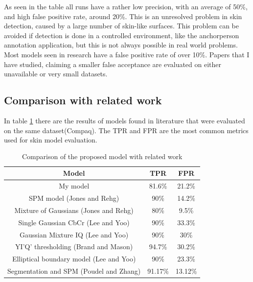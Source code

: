\documentclass[12pt]{report}
\begin{document}
	As seen in the table all runs have a rather low precision, with an average of 50\%, and high false positive rate, around 20\%. This is an unresolved problem in skin detection, caused by a large number of skin-like surfaces. This problem can be avoided if detection is done in a controlled environment, like the anchorperson annotation application, but this is not always possible in real world problems.  Most models seen in research have a false positive rate of over 10\%. Papers that I have studied, claiming a smaller false acceptance are evaluated on either unavailable or very small datasets.

	\subsection{Comparison with related work}
	
	In table \ref{tab:results_comparison} there are the results of models found in literature that were evaluated on the same dataset(Compaq). The TPR and FPR are the most common metrics used for skin model evaluation.
	
	\begin{table}[h!]
		\begin{center}
			\caption{Comparison of the proposed model with related work}
			\label{tab:results_comparison}
			\begin{tabular}{c|c|c}
				\textbf{Model} & \textbf{TPR} & \textbf{FPR} \\
				\hline
				My model & 81.6\% & 21.2\% \\
				SPM model (Jones and Rehg\cite{compaq}) & 90\% & 14.2\% \\
				Mixture of Gaussians (Jones and Rehg\cite{compaq}) & 80\% & 9.5\% \\
				Single Gaussian CbCr (Lee and Yoo\cite{gaussian_applied}) & 90\% & 33.3\% \\
				Gaussian Mixture IQ (Lee and Yoo\cite{gaussian_applied}) & 90\% & 30\% \\
				YI'Q' thresholding (Brand and Mason\cite{i_threshold_applied}) & 94.7\% & 30.2\% \\
				Elliptical boundary model (Lee and Yoo\cite{gaussian_applied}) &
				90\% & 23.3\% \\
				Segmentation and SPM (Poudel and Zhang\cite{superpixels_applied_2}) & 91.17\% & 13.12\% \\
				
			\end{tabular}
		\end{center}
	\end{table}
	
\end{document}
